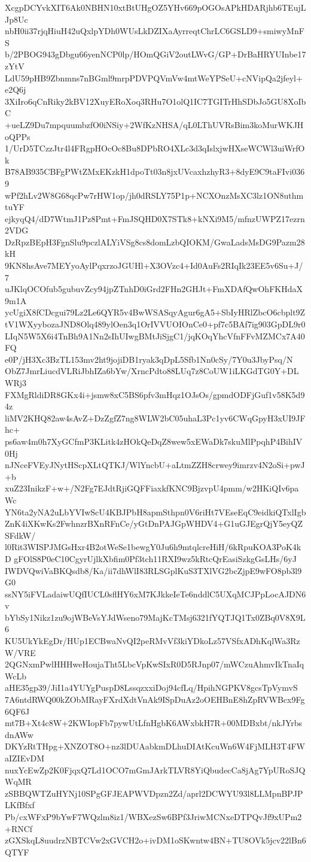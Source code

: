 XcgpDCYvkXIT6Ak0NBHN10xtBtUHgOZ5YHv669pOGOsAPkHDARjhb6TEujLJp8Uc
nbH0ii37rjqHiuH42uQxlpYDh0WUsLkDZIXaAyrreqtChrLC6GSLD9+smiwyMnFS
b/2PBOG943gDbgu66yenNCP0lp/HOmQGiV2outLWvG/GP+DrBaHRYUInbe17zYtV
LdU59pHB9Zbnmns7nBGml9mrpPDVPQVmVw4mtWeYPSeU+cNVipQa2jfeyl+e2Q6j
3XiIro6qCnRiky2kBV12XuyERoXoq3RHu7O1olQ1IC7TGITrHhSDbJo5GU8XoIbC
+ueLZ9Du7mpquumbzfO0iNSiy+2WfKzNHSA/qL0LThUVRsBim3koMurWKJHoQPPs
1/UrD5TCzzJtr4l4FRgpHOcOc8Bu8DPbRO4XLc3d3qIslxjwHXseWCWl3uiWrfOk
B78AB935CBFgPWtZMxEKzkH1dpoTt03n8jxUVcaxhzhyR3+8dyE9C9taFIvi0369
wPf2hLv2W8G68qcPw7rHW1op/jh0dRSLY75P1p+NCXOnzMsXC3lz1ON8uthmtuYF
ejkyqQ4/dD7WtmJ1Pz8Pmt+FmJSQHD0X7STk8+kNXi9M5/mfnzUWPZ17ezrn2VDG
DzRpzBEpH3FgnSlu9pczlALYiVSg8cs8domLzbQIOKM/GwaLadsMsDG9Pazm28kH
9KN8hsAve7MEYyoAylPqxrzoJGUHl+X3OVzc4+Id0AuFs2RIqIk23EE5v6Su+J/7
uJKlqOCOfub5gubuvZcy94jpZTnhD0iGrd2FHn2GHJt+FmXDAfQwOhFKHdaX9m1A
ycUgiX8fCDcgui79Lz2Le6QYR5v4BwWSASqyAgur6gA5+SbIyHRlZbcO6cbplt9Z
tV1WXyybozaJND8Olq489ylOen3q1OrIVVUOIOnCe0+pf7c5BAf7ig903GpDL9r0
LIqN5W5X6i4TnBh9A1Nn2sIhUIwgBMtJiSjgC1/jqKOqYhcVfnFFvMZMCx7A40FQ
e0P/jH3Xc3BzTL153mv2ht9jojiDB1ryak3qDpL5Sfb1Nn0cSy/7Y0u3JbyPsq/N
ObZ7JmrLiucdVLRiJbhIZa6bYw/XrncPdto88LUq7z8CoUW1iLKGdTG0Y+DLWRj3
FXMgRldiDR8GKx4i+jsmw8xC5BS6pfv3mHqz1OJsOs/gpmdODFjGuf1v58K5d94z
liMV2KHQ82aw4sAvZ+DzZgfZ7ng8WLW2bC05uhaL3Pc1yv6CWqGpyH3xUI9JFhc+
ps6aw4m0h7XyGCfmP3KLitk4zHOkQeDqZ8wew5xEWaDk7skuMlPpqhP4BihIV0Hj
nJNceFVEyJNytHScpXLtQTKJ/WlYncbU+aLtmZZH8crwey9imrzv4N2oSi+pwJ+b
xuZ23InikzF+w+/N2Fg7EJdtRjiGQFFiaxkfKNC9BjzvpU4pmm/w2HKiQIv6paWc
YN6ta2yNA2uLbYVIwScU4KBJPbH8apmSthpn0V6riHt7VEseEqC9eidkiQTxlIgb
ZnK4iXKwKs2FwhnzrBXnRFnCe/yGtDnPAJGpWHDV4+G1uGJEgrQjY5eyQZSFdkW/
l0Rit3WISPJMGsHxr4B2otWeSe1bewgY0Ju6h9mtqlcreHiH/6kRpuKOA3PoK4kD
gFOlS8P0eC10CgyrUjlkXbfim0Pf3tch11RXI9wz5kRtcQrEasiSzkgGsLHs/6yJ
IWDVQwiVaBKQsdb8/Ka/ii7dhWlI83RLSGplKuS3TXlVG2bcZjpE9wFO8pb3l9G0
ssNY5iFVLadaiwUQfIUCL0sflHY6xM7KJkkeIeTe6nddlC5UXqMCJPpLocAJDN6v
bYbSy1Nikz1zu9ojWBeVsYJdWseno79MajKcTMsj6321fYQTJQ1Tx0ZBq0V8X9L6
KU5UkYkEgDr/HUp1ECBwaNvQI2peRMvVf3kiYDkoLz57VSfxADhKqlWa3RzW/VRE
2QGNxmPwlHHHweHoujaTht5LbcVpKwSIxR0D5RJnp07/mWCzuAhmvIkTnaIqWcLb
aHE35gp39/JiI1a4YUYgPuspD8LssqzxxiDoj94cfLq/HpihNGPKV8gcsTpVymvS
7A6ntdRWQ00kZObMRayFXrdXdtVnAk9ISpDuAz2oOEHBnE8hZpRVWBcx9Fg6QF6J
mt7B+Xt4c8W+2KWIopFb7pywUtLfnHgbK6AWxbkH7R+00MDBxbt/nkJYrbsdnAWw
DKYzRtTHpg+XNZOT8O+nz3lDUAabkmDLhuDIAtKcuWn6W4FjMLH3T4FWaIZIEvDM
nuxYcEwZp2K0FjqxQ7Ld1OCO7mGmJArkTLVR8YiQbudecCa8jAg7YpURoSJQWqMR
zSBBQWTZuHYNj10SPgGFJEAPWVDpzn2Zd/aprl2DCWYU93l8LLMpnBPJPLKfBfxf
Pb/cxWFxP9bYwF7WQzlm8iz1/WBXezSw6BPf3JriwMCNxeDTPQvJf9xUPm2+RNCf
zGXSkqL8uudrzNBTCVw2xGVCH2o+ivDM1oSKwntw4BN+TU8OVk5jcv22lBn6QTYF
